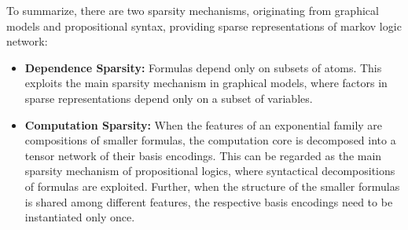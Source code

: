 


To summarize, there are two sparsity mechanisms, originating from graphical models and propositional syntax, providing sparse representations of markov logic network:
\begin{itemize}
	\item \textbf{Dependence Sparsity:} Formulas depend only on subsets of atoms.
		This exploits the main sparsity mechanism in graphical models, where factors in sparse representations depend only on a subset of variables.
	\item \textbf{Computation Sparsity:}
		When the features of an exponential family are compositions of smaller formulas, the computation core is decomposed into a tensor network of their basis encodings.
		This can be regarded as the main sparsity mechanism of propositional logics, where syntactical decompositions of formulas are exploited.
		Further, when the structure of the smaller formulas is shared among different features, the respective basis encodings need to be instantiated only once.
\end{itemize}




